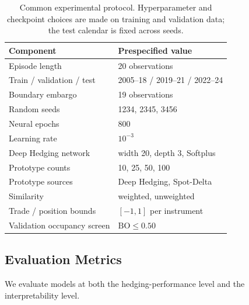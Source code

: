 \documentclass[sigconf]{acmart}
\begin{document}
\begin{table}[t]
\centering
\small
\begin{tabular}{ll}
\toprule
Component & Prespecified value \\
\midrule
Episode length & 20 observations \\
Train / validation / test & 2005--18 / 2019--21 / 2022--24 \\
Boundary embargo & 19 observations \\
Random seeds & 1234, 2345, 3456 \\
Neural epochs & 800 \\
Learning rate & $10^{-3}$ \\
Deep Hedging network & width 20, depth 3, Softplus \\
Prototype counts & 10, 25, 50, 100 \\
Prototype sources & Deep Hedging, Spot-Delta \\
Similarity & weighted, unweighted \\
Trade / position bounds & $[-1,1]$ per instrument \\
Validation occupancy screen & $\mathrm{BO}\leq 0.50$ \\
\bottomrule
\end{tabular}
\caption{Common experimental protocol. Hyperparameter and checkpoint choices
are made on training and validation data; the test calendar is fixed across
seeds.}
\label{tab:protocol}
\end{table}

\subsection{Evaluation Metrics}
\label{subsec:evaluation_metrics}

We evaluate models at both the hedging-performance level and the interpretability level.
\end{document}
